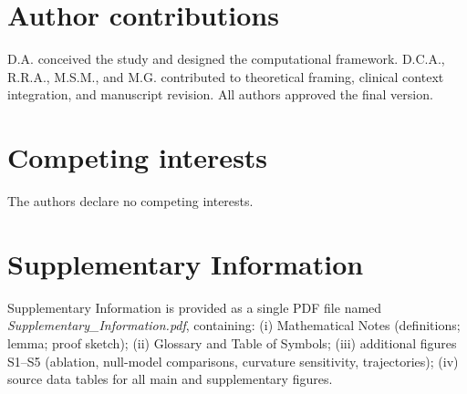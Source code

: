 \documentclass[fleqn,10pt]{wlscirep}
\begin{document}
\section*{Author contributions}
D.A. conceived the study and designed the computational framework. D.C.A., R.R.A., M.S.M., and M.G. contributed to theoretical framing, clinical context integration, and manuscript revision. All authors approved the final version.

\section*{Competing interests}
The authors declare no competing interests.

\section*{Supplementary Information}
Supplementary Information is provided as a single PDF file named \emph{Supplementary\_Information.pdf}, containing: (i) Mathematical Notes (definitions; lemma; proof sketch); (ii) Glossary and Table of Symbols; (iii) additional figures S1--S5 (ablation, null-model comparisons, curvature sensitivity, trajectories); (iv) source data tables for all main and supplementary figures.


\end{document}
